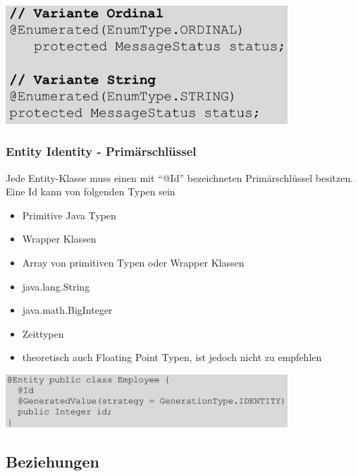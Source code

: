\documentclass{report}
\newenvironment{Figure}
	{\par\medskip\noindent\minipage{\linewidth}}
	{\endminipage\par\medskip}
\theoremstyle{definition}
\theoremstyle{example}
\begin{document}
\begin{Figure}
\centering
\includegraphics[width=400px]{img/MappingEnumerations.png}
	\label{fig:Mapping Enumerations}
\end{Figure}

\subsubsection{Entity Identity - Primärschlüssel}
Jede Entity-Klasse muss einen mit ``@Id'' bezeichneten Primärschlüssel besitzen.\\
Eine Id kann von folgenden Typen sein
\begin{itemize}
	\item Primitive Java Typen
	\item Wrapper Klassen
	\item Array von primitiven Typen oder Wrapper Klassen
	\item java.lang.String
	\item java.math.BigInteger
	\item Zeittypen
	\item theoretisch auch Floating Point Typen, ist jedoch nicht zu empfehlen
\end{itemize}

\begin{Figure}
\centering
\includegraphics[width=400px]{img/EntityPrimaryKey.png}
	\label{fig:Generierung von Primary Keys}
\end{Figure}

\subsection{Beziehungen}
\end{document}

